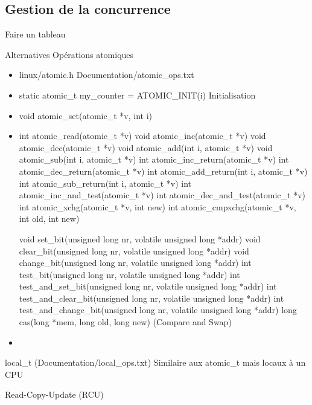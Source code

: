 

\subsection{Gestion de la concurrence}



Faire un tableau
\begin{frame}{Alternatives}
  Opérations atomiques
  \begin{itemize}
  \item linux/atomic.h Documentation/atomic_ops.txt
  \item static atomic_t my_counter = ATOMIC_INIT(i) Initialisation
  \item void atomic_set(atomic_t *v, int i)
  \item int atomic_read(atomic_t *v)
        void atomic_inc(atomic_t *v)
        void atomic_dec(atomic_t *v)
        void atomic_add(int i, atomic_t *v)
        void atomic_sub(int i, atomic_t *v)
        int atomic_inc_return(atomic_t *v)
        int atomic_dec_return(atomic_t *v)
        int atomic_add_return(int i, atomic_t *v)
        int atomic_sub_return(int i, atomic_t *v)
        int atomic_inc_and_test(atomic_t *v)
        int atomic_dec_and_test(atomic_t *v)
        int atomic_xchg(atomic_t *v, int new)
        int atomic_cmpxchg(atomic_t *v, int old, int new)


        void set_bit(unsigned long nr, volatile unsigned long *addr)
        void clear_bit(unsigned long nr, volatile unsigned long *addr)
        void change_bit(unsigned long nr, volatile unsigned long *addr)
        int test_bit(unsigned long nr, volatile unsigned long *addr)
        int test_and_set_bit(unsigned long nr, volatile unsigned long *addr)
        int test_and_clear_bit(unsigned long nr, volatile unsigned long *addr)
        int test_and_change_bit(unsigned long nr, volatile unsigned long *addr)
        long cas(long *mem, long old, long new) (Compare and Swap)

  \item 
  \end{itemize} 
local_t (Documentation/local_ops.txt) Similaire aux atomic_t mais locaux à un CPU

 Read-Copy-Update (RCU)
\end{frame} 


